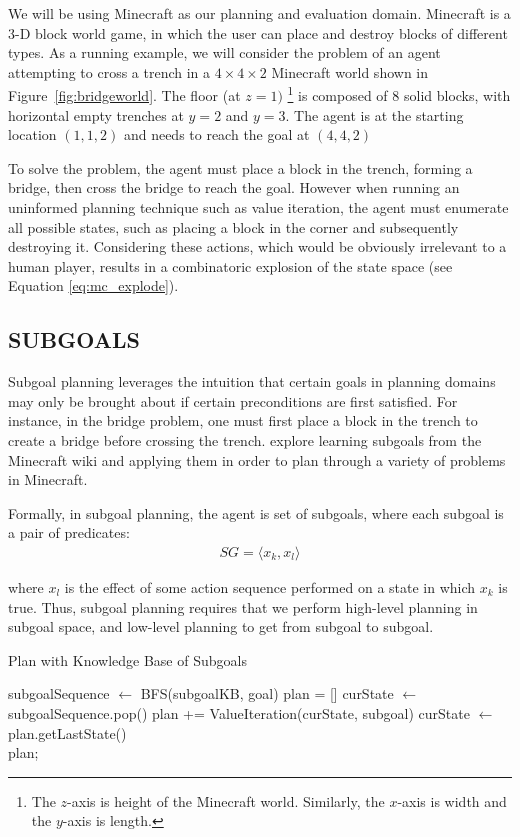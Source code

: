 \documentclass[]{article}
\begin{document}
We will be using Minecraft as our planning and evaluation domain. Minecraft
is a 3-D block world game, in which the user can place and destroy blocks of
different types. As a running example, we will consider the problem of an agent
attempting to cross a trench in a $4 \times 4 \times 2$ Minecraft world shown
in Figure~\ref{fig:bridgeworld}. The floor (at $z = 1)$ \footnote{The $z$-axis
is height of the Minecraft world. Similarly, the $x$-axis is width and the
$y$-axis is length.} is composed of 8 solid blocks, with horizontal empty
trenches at $y = 2$ and $y = 3$. The agent is  at the starting location
$(1, 1, 2)$ and needs to reach the goal at $(4,4,2)$

To solve the problem, the agent must
place a block in the trench, forming a bridge, then cross the bridge
to reach the goal.  However when running an uninformed planning
technique such as value iteration, the agent must enumerate all
possible states, such as placing a block in the corner and
subsequently destroying it.  Considering these actions, which would be
obviously irrelevant to a human player, results in a combinatoric
explosion of the state space (see Equation \ref{eq:mc_explode}).

\subsection{SUBGOALS}

Subgoal planning leverages the intuition that certain goals in
planning domains may only be brought about if certain preconditions
are first satisfied. For instance, in the bridge problem, one must
first place a block in the trench to create a bridge before crossing
the trench.  \citet{branavan12a} explore learning subgoals from the
Minecraft wiki and applying them in order to plan through a variety of
problems in Minecraft.  

Formally, in subgoal planning, the agent is set of subgoals, where each subgoal is a pair of predicates:
\begin{align}
SG = \langle x_k, x_l \rangle
\end{align}

where $x_l$ is the effect of some action sequence performed on 
a state in which $x_k$ is true. Thus, subgoal planning requires 
that we perform high-level planning in subgoal space, and low-level 
planning to get from subgoal to subgoal.

\begin{algorithm}
  \caption{Plan with Knowledge Base of Subgoals}
  \begin{algorithmic}[1]
    \State subgoalSequence $\gets$ BFS(subgoalKB, goal)
    \State plan = []
    \State curState $\gets$ subgoalSequence.pop()
    		\State plan += ValueIteration(curState, subgoal)
		\State curState $\gets$ plan.getLastState()
    \EndFor \\
    \Return plan;
  \end{algorithmic}
\end{algorithm}
\end{document}
